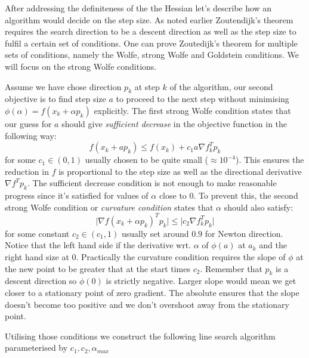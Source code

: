 \documentclass[11pt]{article}
\begin{document}
    After addressing the definiteness of the the Hessian let's describe how an algorithm would decide on the step size.
    As noted earlier Zoutendijk's theorem requires the search direction to be a descent direction as well as the step size to fulfil a certain set of conditions.
    One can prove Zoutedijk's theorem for multiple sets of conditions, namely the Wolfe, strong Wolfe and Goldstein conditions.
    We will focus on the strong Wolfe conditions.

    Assume we have chose direction $p_k$ at step $k$ of the algorithm, our second objective is to find step size $a$ to proceed to the next step without minimising $\phi(\alpha) = f(x_k + \alpha p_k)$ explicitly.
    The first strong Wolfe condition states that our guess for $a$ should give \textit{sufficient decrease} in the objective function in the following way:
    \begin{equation}
        f(x_k + ap_k) \leq f(x_k) + c_1 a \nabla f_k ^T p_k
    \end{equation}
    for some $c_1 \in (0,1)$ usually chosen to be quite small ($\approx 10^{-4}$). This ensures the reduction in $f$ is proportional to the step size as well as the directional derivative $\nabla f ^T p_k$.
    The sufficient decrease condition is not enough to make reasonable progress since it's satisfied for values of $\alpha$ close to 0.
    To prevent this, the second strong Wolfe condition or \textit{curvature condition} states that $\alpha$ should also satisfy:
    \begin{equation}
        \lvert \nabla f(x_k + \alpha p_k )^T p_k \rvert \leq \lvert c_2 \nabla f_k^T p_k \rvert
    \end{equation}
    for some constant $c_2 \in (c_1, 1)$ usually set around $0.9$ for Newton direction.
    Notice that the left hand side if the derivative wrt. $\alpha$ of $\phi(a)$ at $a_k$ and the right hand size at $0$.
    Practically the curvature condition requires the slope of $\phi$ at the new point to be greater that at the start times $c_2$.
    Remember that $p_k$ is a descent direction so $\phi(0)$ is strictly negative.
    Larger slope would mean we get closer to a stationary point of zero gradient.
    The absolute ensures that the slope doesn't become too positive and we don't overshoot away from the stationary point.

    Utilising those conditions we construct the following line search algorithm parameterised by $c_1, c_2, \alpha_{max}$
\end{document}
